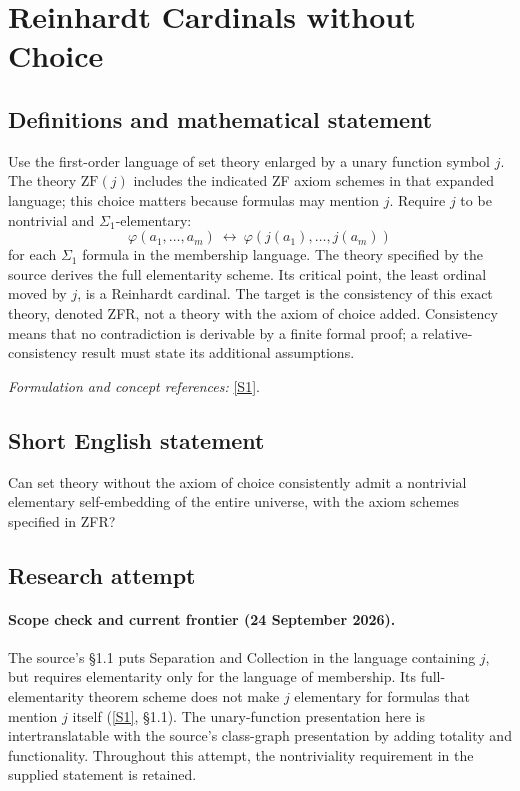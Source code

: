 \documentclass[11pt]{article}
\newcommand{\sref}[2]{\hyperlink{source:#1:#2}{[S#2]}}
\newif\ifshowcatalogue
\newcommand{\cataloguescope}[1]{\ifshowcatalogue
 \paragraph{Exact scope in the supplied catalogue.}
 \begin{quote}\small #1\end{quote}\fi}
\begin{document}
\setcounter{section}{0}
\clearpage
\section*{\texorpdfstring{Reinhardt Cardinals without Choice}{Reinhardt Cardinals without Choice}}\label{1357}
\subsection{Definitions and mathematical statement}
Use the first-order language of set theory enlarged by a unary function symbol $j$. The theory $\mathrm{ZF}(j)$ includes the indicated ZF axiom schemes in that expanded language; this choice matters because formulas may mention $j$. Require $j$ to be nontrivial and $\Sigma_1$-elementary:
\[
 \varphi(a_1,\ldots,a_m)\ \longleftrightarrow\
 \varphi(j(a_1),\ldots,j(a_m))
\]
for each $\Sigma_1$ formula in the membership language. The theory specified by the source derives the full elementarity scheme. Its critical point, the least ordinal moved by $j$, is a Reinhardt cardinal. The target is the consistency of this exact theory, denoted ZFR, not a theory with the axiom of choice added. Consistency means that no contradiction is derivable by a finite formal proof; a relative-consistency result must state its additional assumptions.
\par\smallskip\textit{Formulation and concept references:} \sref{1357}{1}.
\cataloguescope{Determine whether ZFR is consistent, where ZFR is the first-order theory ZF(j) plus the assertion that a nontrivial function symbol j:V->V is Sigma\_1-elementary and hence fully elementary as a theorem scheme.}
\subsection{Short English statement}
Can set theory without the axiom of choice consistently admit a nontrivial elementary self-embedding of the entire universe, with the axiom schemes specified in ZFR?
\subsection{Research attempt}

\paragraph{Scope check and current frontier (24 September 2026).}
The source's \S1.1 puts Separation and Collection in the language containing
$j$, but requires elementarity only for the language of membership.  Its
full-elementarity theorem scheme does not make $j$ elementary for formulas
that mention $j$ itself (\sref{1357}{1}, \S1.1).  The unary-function presentation
here is intertranslatable with the source's class-graph presentation by adding
totality and functionality.  Throughout this attempt, the nontriviality
requirement in the supplied statement is retained.
\end{document}
